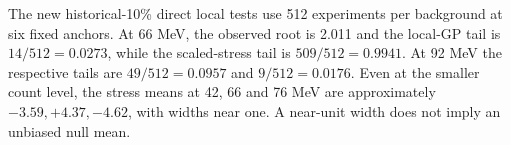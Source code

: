 The new historical-10\% direct local tests use 512 experiments per background at six fixed anchors. At 66 MeV, the observed root is 2.011 and the local-GP tail is $14/512=0.0273$, while the scaled-stress tail is $509/512=0.9941$. At 92 MeV the respective tails are $49/512=0.0957$ and $9/512=0.0176$. Even at the smaller count level, the stress means at 42, 66 and 76 MeV are approximately $-3.59,+4.37,-4.62$, with widths near one. A near-unit width does not imply an unbiased null mean.
